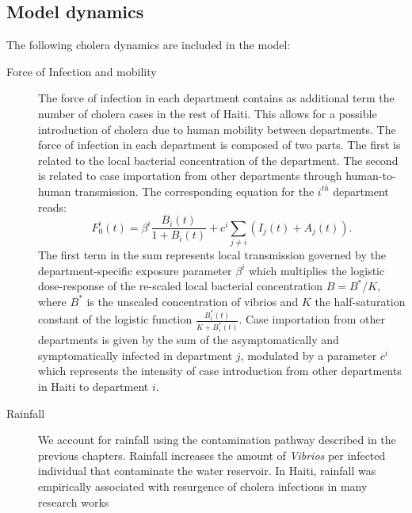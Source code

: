 \subsection{Model dynamics} 
The following cholera dynamics are included in the model:
\begin{description}
    \item[Force of Infection and mobility] The force of infection in each department contains as additional term  the number of cholera cases in the rest of Haiti. This allows for a possible introduction of cholera due to  human mobility between departments. The force of infection in each department is composed of two parts. The first is related to the local bacterial concentration of the department. The second is related to case importation from other departments through human-to-human transmission. The corresponding equation for the $i^{th}$ department reads:
    \begin{equation*}
    F^i_0(t)=\beta^i\frac{B_i(t)}{1+B_i(t)}+c^i \sum_{j\ne i} (I_j(t)+A_j(t)).
    \end{equation*}
    The first term in the sum represents local transmission governed by the department-specific exposure parameter $\beta^i$ which multiplies the logistic dose-response of the re-scaled local bacterial concentration $B = B^*/K$, where $B^*$ is the unscaled concentration of vibrios and $K$ the half-saturation constant of the logistic function $\frac{B^*_i(t)}{K+B^*_i(t)}$.
    Case importation from other departments is given by the sum of the asymptomatically and symptomatically infected in department $j$, modulated by a parameter $c^i$ which represents the intensity of case introduction from other departments in Haiti  to department $i$.
    \item[Rainfall] We account for rainfall using the contamination pathway described in the previous chapters. Rainfall increases the amount of \textit{Vibrios} per infected individual that contaminate the water reservoir. In Haiti, rainfall was empirically associated with resurgence of cholera infections in many research works

\end{description}
